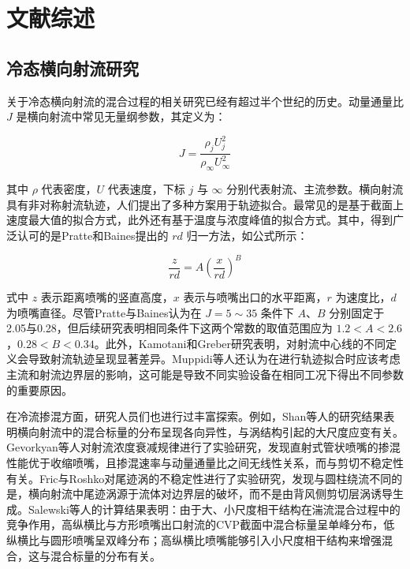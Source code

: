 
\chapter{文献综述}

\section{冷态横向射流研究}

关于冷态横向射流的混合过程的相关研究已经有超过半个世纪的历史\cite{Karagozian2010,Gevorkyan2016}。动量通量比 $J$ 是横向射流中常见无量纲参数，其定义为：

\begin{equation}
	J = \frac{\rho_{j}U_{j}^{2}}{\rho_{\infty}U_{\infty}^{2}}
\end{equation}

其中 $\rho$ 代表密度，$U$ 代表速度，下标 $j$ 与 $\infty$ 分别代表射流、主流参数。横向射流具有非对称射流轨迹，人们提出了多种方案用于轨迹拟合。最常见的是基于截面上速度最大值的拟合方式\cite{Kamotani1972}，此外还有基于温度\cite{Hasselbrink2001a}与浓度\cite{Broadwell1984}峰值的拟合方式。其中，得到广泛认可的是Pratte和Baines提出的 $rd$ 归一方法\cite{Pratte1967}，如公式所示：

\begin{equation}
	\frac{z}{rd} = A\left(\frac{x}{rd}\right)^B
\end{equation}

式中 $z$ 表示距离喷嘴的竖直高度，$x$ 表示与喷嘴出口的水平距离，$r$ 为速度比，$d$ 为喷嘴直径。尽管Pratte与Baines认为在 $J = 5\sim 35$ 条件下 $A$、$B$ 分别固定于2.05与0.28，但后续研究表明相同条件下这两个常数的取值范围应为 $1.2 < A < 2.6$，$0.28 < B < 0.34$\cite{Hasselbrink2001a}。此外，Kamotani和Greber\cite{Kamotani1972}研究表明，对射流中心线的不同定义会导致射流轨迹呈现显著差异。Muppidi等人\cite{Muppidi2005}还认为在进行轨迹拟合时应该考虑主流和射流边界层的影响，这可能是导致不同实验设备在相同工况下得出不同参数的重要原因。

在冷流掺混方面，研究人员们也进行过丰富探索。例如，Shan等人\cite{Shan2006}的研究结果表明横向射流中的混合标量的分布呈现各向异性，与涡结构引起的大尺度应变有关。Gevorkyan等人\cite{Gevorkyan2016}对射流浓度衰减规律进行了实验研究，发现直射式管状喷嘴的掺混性能优于收缩喷嘴，且掺混速率与动量通量比之间无线性关系，而与剪切不稳定性有关。Fric与Roshko\cite{Fric1994}对尾迹涡的不稳定性进行了实验研究，发现与圆柱绕流不同的是，横向射流中尾迹涡源于流体对边界层的破坏，而不是由背风侧剪切层涡诱导生成。Salewski等人\cite{Salewski2008}的计算结果表明：由于大、小尺度相干结构在湍流混合过程中的竞争作用，高纵横比与方形喷嘴出口射流的CVP截面中混合标量呈单峰分布，低纵横比与圆形喷嘴呈双峰分布；高纵横比喷嘴能够引入小尺度相干结构来增强混合，这与混合标量的分布有关。

